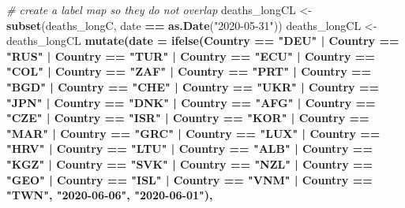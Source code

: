 \documentclass[
]{article}
\newenvironment{Shaded}{\begin{snugshade}}{\end{snugshade}}
\newcommand{\CommentTok}[1]{\textcolor[rgb]{0.56,0.35,0.01}{\textit{#1}}}
\newcommand{\DataTypeTok}[1]{\textcolor[rgb]{0.13,0.29,0.53}{#1}}
\newcommand{\KeywordTok}[1]{\textcolor[rgb]{0.13,0.29,0.53}{\textbf{#1}}}
\newcommand{\NormalTok}[1]{#1}
\newcommand{\OperatorTok}[1]{\textcolor[rgb]{0.81,0.36,0.00}{\textbf{#1}}}
\newcommand{\StringTok}[1]{\textcolor[rgb]{0.31,0.60,0.02}{#1}}
\begin{document}
\begin{Shaded}
\begin{Highlighting}[]
{\CommentTok{# create a label map so they do not overlap}
\NormalTok{deaths_longCL <-}\StringTok{ }\KeywordTok{subset}\NormalTok{(deaths_longC, date }\OperatorTok{==}\StringTok{ }\KeywordTok{as.Date}\NormalTok{(}\StringTok{"2020-05-31"}\NormalTok{))}
\NormalTok{deaths_longCL <-}\StringTok{ }\NormalTok{deaths_longCL }\OperatorTok{%
\StringTok{  }\KeywordTok{mutate}\NormalTok{(}\DataTypeTok{date =} \KeywordTok{ifelse}\NormalTok{(Country }\OperatorTok{==}\StringTok{ "DEU"} \OperatorTok{|}\StringTok{ }\NormalTok{Country }\OperatorTok{==}\StringTok{ "RUS"} \OperatorTok{|}\StringTok{ }\NormalTok{Country }\OperatorTok{==}\StringTok{ "TUR"} \OperatorTok{|}\StringTok{ }\NormalTok{Country }\OperatorTok{==}\StringTok{ "ECU"} \OperatorTok{|}\StringTok{ }\NormalTok{Country }\OperatorTok{==}\StringTok{ "COL"} \OperatorTok{|}\StringTok{ }\NormalTok{Country }\OperatorTok{==}\StringTok{ "ZAF"} \OperatorTok{|}\StringTok{ }\NormalTok{Country }\OperatorTok{==}\StringTok{ "PRT"} \OperatorTok{|}\StringTok{ }\NormalTok{Country }\OperatorTok{==}\StringTok{ "BGD"} \OperatorTok{|}\StringTok{ }\NormalTok{Country }\OperatorTok{==}\StringTok{ "CHE"} \OperatorTok{|}\StringTok{ }\NormalTok{Country }\OperatorTok{==}\StringTok{ "UKR"} \OperatorTok{|}\StringTok{ }\NormalTok{Country }\OperatorTok{==}\StringTok{ "JPN"} \OperatorTok{|}\StringTok{ }\NormalTok{Country }\OperatorTok{==}\StringTok{ "DNK"} \OperatorTok{|}\StringTok{ }\NormalTok{Country }\OperatorTok{==}\StringTok{ "AFG"} \OperatorTok{|}\StringTok{ }\NormalTok{Country }\OperatorTok{==}\StringTok{ "CZE"} \OperatorTok{|}\StringTok{ }\NormalTok{Country }\OperatorTok{==}\StringTok{ "ISR"} \OperatorTok{|}\StringTok{ }\NormalTok{Country }\OperatorTok{==}\StringTok{ "KOR"} \OperatorTok{|}\StringTok{ }\NormalTok{Country }\OperatorTok{==}\StringTok{ "MAR"} \OperatorTok{|}\StringTok{ }\NormalTok{Country }\OperatorTok{==}\StringTok{ "GRC"} \OperatorTok{|}\StringTok{ }\NormalTok{Country }\OperatorTok{==}\StringTok{ "LUX"} \OperatorTok{|}\StringTok{ }\NormalTok{Country }\OperatorTok{==}\StringTok{ "HRV"} \OperatorTok{|}\StringTok{ }\NormalTok{Country }\OperatorTok{==}\StringTok{ "LTU"} \OperatorTok{|}\StringTok{ }\NormalTok{Country }\OperatorTok{==}\StringTok{ "ALB"} \OperatorTok{|}\StringTok{ }\NormalTok{Country }\OperatorTok{==}\StringTok{ "KGZ"} \OperatorTok{|}\StringTok{ }\NormalTok{Country }\OperatorTok{==}\StringTok{ "SVK"} \OperatorTok{|}\StringTok{ }\NormalTok{Country }\OperatorTok{==}\StringTok{ "NZL"} \OperatorTok{|}\StringTok{ }\NormalTok{Country }\OperatorTok{==}\StringTok{ "GEO"} \OperatorTok{|}\StringTok{ }\NormalTok{Country }\OperatorTok{==}\StringTok{ "ISL"} \OperatorTok{|}\StringTok{ }\NormalTok{Country }\OperatorTok{==}\StringTok{ "VNM"} \OperatorTok{|}\StringTok{ }\NormalTok{Country }\OperatorTok{==}\StringTok{ "TWN"}\NormalTok{, }\StringTok{"2020-06-06"}\NormalTok{, }\StringTok{"2020-06-01"}\NormalTok{),}
}}
\end{Highlighting}
\end{Shaded}
\end{document}
